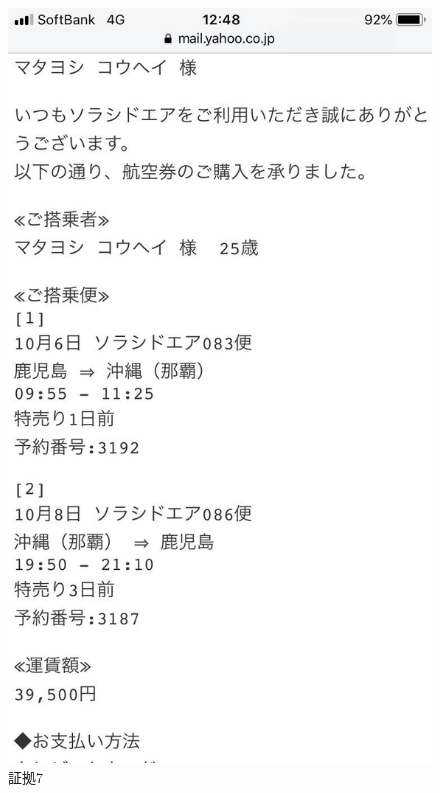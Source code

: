 \begin{figure}[H]
  \centering
  \includegraphics[clip,scale=0.2]{./section/Taira/figures/fig7}
  \caption{証拠7}
\label{fig7}
\end{figure}


